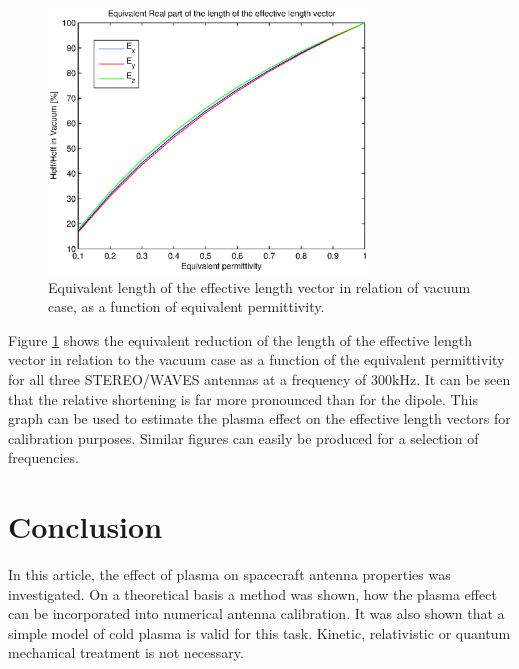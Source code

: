 \documentclass[two-coloumn,ras]{agutex}
\begin{document}
\begin{article}
\begin{figure}
  \noindent\includegraphics[width=20pc]{heff_shortening_stereo.eps}
\caption{Equivalent length of the effective length vector in relation of vacuum case, as a function of equivalent permittivity.}
\label{fig:relative_heff_shortening_stereo}
\end{figure}

Figure \ref{fig:relative_heff_shortening_stereo} shows the equivalent reduction of the length of the effective length vector in relation to the vacuum case as a function of the equivalent permittivity for all three STEREO/WAVES antennas at a frequency of 300kHz. It can be seen that the relative shortening is far more pronounced than for the dipole. This graph can be used to estimate the plasma effect on the effective length vectors for calibration purposes. Similar figures can easily be produced for a selection of frequencies.\\

\section{Conclusion}
In this article, the effect of plasma on spacecraft antenna properties was investigated. On a theoretical basis a method was shown, how the plasma effect can be incorporated into numerical antenna calibration. It was also shown that a simple model of cold plasma is valid for this task. Kinetic, relativistic or quantum mechanical treatment is not necessary.\\


\end{article}
\end{document}
